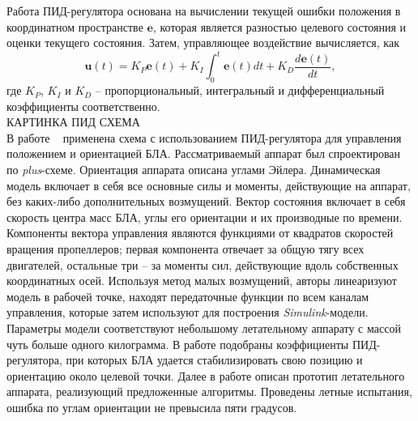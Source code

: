 \documentclass[a4paper,14pt,oneside,openany]{memoir}
\begin{document}
	Работа ПИД-регулятора основана на вычислении текущей ошибки положения в координатном пространстве $\bm{e}$, которая является разностью целевого состояния и оценки текущего состояния. Затем, управляющее воздействие вычисляется, как
	\begin{equation} \label{eq:pid_common}
	\bm{u}(t) = K_P \bm{e}(t) + K_I\int_0^t \bm{e}(t) dt + K_D \frac{d\bm{e}(t)}{dt},
	\end{equation}
	где $K_P$, $K_I$ и $K_D$ -- пропорциональный, интегральный и дифференциальный коэффициенты соответственно.
	\\
	
	КАРТИНКА ПИД СХЕМА
	\\
	
	В работе ~\cite{Li01} применена схема с использованием ПИД-регулятора для управления положением и ориентацией БЛА. Рассматриваемый аппарат был спроектирован по \textit{plus}-схеме. Ориентация аппарата описана углами Эйлера. Динамическая модель включает в себя все основные силы и моменты, действующие на аппарат, без каких-либо дополнительных возмущений. Вектор состояния включает в себя скорость центра масс БЛА, углы его ориентации и их производные по времени. Компоненты вектора управления являются функциями от квадратов скоростей вращения пропеллеров; первая компонента отвечает за общую тягу всех двигателей, остальные три -- за моменты сил, действующие вдоль собственных координатных осей. Используя метод малых возмущений, авторы линеаризуют модель в рабочей точке, находят передаточные функции по всем каналам управления, которые затем используют для построения \textit{Simulink}-модели. Параметры модели соответствуют небольшому летательному аппарату с массой чуть больше одного килограмма. В работе подобраны коэффициенты ПИД-регулятора, при которых БЛА удается стабилизировать свою позицию и ориентацию около целевой точки. Далее в работе описан прототип летательного аппарата, реализующий предложенные алгоритмы. Проведены летные испытания, ошибка по углам ориентации не превысила пяти градусов.
	
\end{document}
